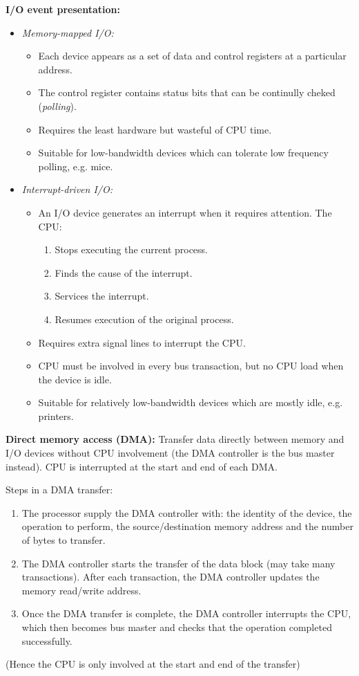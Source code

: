 \documentclass[12pt]{article}
\begin{document}
\textbf{I/O event presentation:}
\begin{itemize}
    \item \textit{Memory-mapped I/O:} 
    \begin{itemize}
        \item Each device appears as a set of data and control registers at a particular address.
        \item The control register contains status bits that can be continully cheked (\textit{polling}).
        \item Requires the least hardware but wasteful of CPU time.
        \item Suitable for low-bandwidth devices which can tolerate low frequency polling, e.g. mice.
    \end{itemize}
    \item \textit{Interrupt-driven I/O:} 
    \begin{itemize}
        \item An I/O device generates an interrupt when it requires attention. The CPU:
    \begin{enumerate}
        \item Stops executing the current process.
        \item Finds the cause of the interrupt.
        \item Services the interrupt.
        \item Resumes execution of the original process.
    \end{enumerate}
        \item Requires extra signal lines to interrupt the CPU.
        \item CPU must be involved in every bus transaction, but no CPU load when the device is idle.
        \item Suitable for relatively low-bandwidth devices which are mostly idle, e.g. printers.
    \end{itemize}
\end{itemize}

\textbf{Direct memory access (DMA):} Transfer data directly between memory and I/O devices without CPU involvement (the DMA controller is the bus master instead). CPU is interrupted at the start and end of each DMA.

Steps in a DMA transfer:
\begin{enumerate}
    \item The processor supply the DMA controller with: the identity of the device, the operation to perform, the source/destination memory address and the number of bytes to transfer.
    \item The DMA controller starts the transfer of the data block (may take many transactions). After each transaction, the DMA controller updates the memory read/write address.
    \item Once the DMA transfer is complete, the DMA controller interrupts the CPU, which then becomes bus master and checks that the operation completed successfully.
\end{enumerate}
(Hence the CPU is only involved at the start and end of the transfer)
\end{document}
